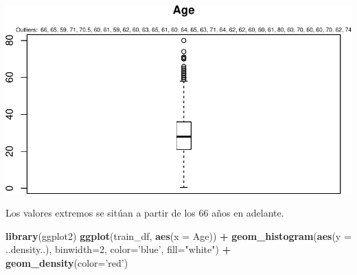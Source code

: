 \documentclass[]{article}
\newenvironment{Shaded}{\begin{snugshade}}{\end{snugshade}}
\newcommand{\CommentTok}[1]{\textcolor[rgb]{0.56,0.35,0.01}{\textit{#1}}}
\newcommand{\DataTypeTok}[1]{\textcolor[rgb]{0.13,0.29,0.53}{#1}}
\newcommand{\DecValTok}[1]{\textcolor[rgb]{0.00,0.00,0.81}{#1}}
\newcommand{\FloatTok}[1]{\textcolor[rgb]{0.00,0.00,0.81}{#1}}
\newcommand{\KeywordTok}[1]{\textcolor[rgb]{0.13,0.29,0.53}{\textbf{#1}}}
\newcommand{\NormalTok}[1]{#1}
\newcommand{\OperatorTok}[1]{\textcolor[rgb]{0.81,0.36,0.00}{\textbf{#1}}}
\newcommand{\StringTok}[1]{\textcolor[rgb]{0.31,0.60,0.02}{#1}}
\begin{document}
\begin{Shaded}
\end{Shaded}

\includegraphics{titanic_data_analysis_PRA2_files/figure-latex/unnamed-chunk-11-1.pdf}

\begin{Shaded}
\end{Shaded}

Los valores extremos se sitúan a partir de los 66 años en adelante.

\begin{Shaded}
\begin{Highlighting}[]
\KeywordTok{library}\NormalTok{(ggplot2)}
\KeywordTok{ggplot}\NormalTok{(train_df, }\KeywordTok{aes}\NormalTok{(}\DataTypeTok{x =}\NormalTok{ Age)) }\OperatorTok{+}\StringTok{ }\KeywordTok{geom_histogram}\NormalTok{(}\KeywordTok{aes}\NormalTok{(}\DataTypeTok{y =}\NormalTok{ ..density..), }\DataTypeTok{binwidth=}\DecValTok{2}\NormalTok{, }\DataTypeTok{color=}\StringTok{'blue'}\NormalTok{, }\DataTypeTok{fill=}\StringTok{"white"}\NormalTok{) }\OperatorTok{+}\StringTok{ }\KeywordTok{geom_density}\NormalTok{(}\DataTypeTok{color=}\StringTok{'red'}\NormalTok{)}
\end{Highlighting}
\end{Shaded}
\end{document}
